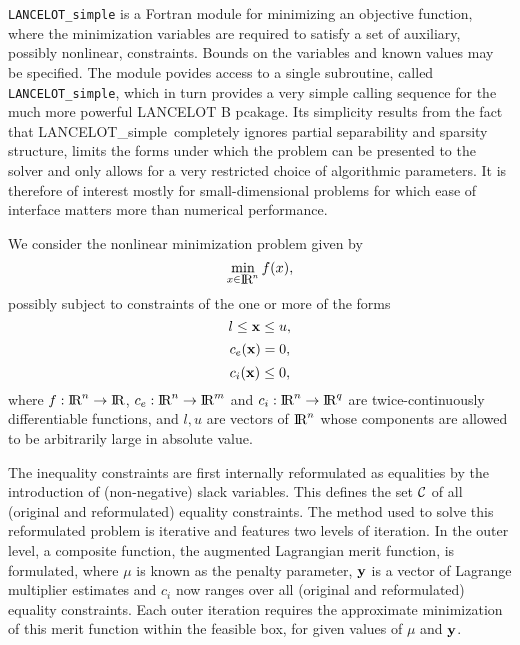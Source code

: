 \documentclass{galahad}
\newcommand{\packagename}{LANCELOT\_simple}
\newcommand{\calC}{{\cal C}}
\renewcommand{\Re}{\hbox{I\hskip -1.5pt R}}
\begin{document}
\galheader


\galsummary

{\tt \packagename} is a Fortran module for minimizing an objective function,
where the minimization variables are required to satisfy a set of auxiliary,
possibly nonlinear, constraints.  Bounds on the variables and known values may
be specified.  The module povides access to a single subroutine, called {\tt
LANCELOT\_simple}, which in turn provides a very simple calling sequence for
the much more powerful LANCELOT B pcakage.  Its simplicity results from the
fact that \packagename\ completely ignores partial separability and sparsity
structure, limits the forms under which the problem can be presented to the
solver and only allows for a very restricted choice of algorithmic parameters.
It is therefore of interest mostly for small-dimensional problems for which
ease of interface matters more than numerical performance.

\galbasics

We consider the nonlinear minimization problem given by
\[                                                                        
\min_{x \in \smallRe^n} f( x ),
\]
possibly subject to constraints of the one or more of the forms         
\[                                                                        
l \leq  {\mathbf{x}} \leq u,
\]
\[                                                                        
c_e( {\mathbf{x}} )  = 0,
\]
\[                                                                        
c_i( {\mathbf{x}} ) \leq 0,
\]
where $f: \Re^n \rightarrow \Re$, $c_e: \Re^n \rightarrow \Re^{m}$ and 
$c_i: \Re^n \rightarrow \Re^{q}$ are twice-continuously differentiable
functions, and $l, u$ are vectors of $\Re^n$ whose components are allowed
to be arbitrarily large in absolute value. 

The inequality constraints are first internally reformulated as equalities by
the introduction of (non-negative) slack variables. This defines the set
$\calC$ of all (original and reformulated) equality constraints. The method
used to solve this reformulated problem is iterative and features two levels of
iteration. In the outer level, a composite function, the augmented Lagrangian
merit function, 
\eqn{objectiveb}{
\phi( \bmx, \bmy, \mu ) = f(\bmx) + \sum_{i \in \calC} 
 y_i c_i (\bmx) + \frac{1}{2 \mu} \sum_{i\in \calC} [c_i (\bmx)]^2,
}
is formulated, where $\mu$ is known as the penalty parameter,  ${\mathbf{y}}$ is a
vector of Lagrange multiplier estimates and $c_i$ now ranges over all
(original and reformulated) equality constraints.  Each outer iteration
requires the approximate minimization of this merit function
within the feasible box, for given values of $\mu$ and ${\mathbf{y}}$.
\end{document}
